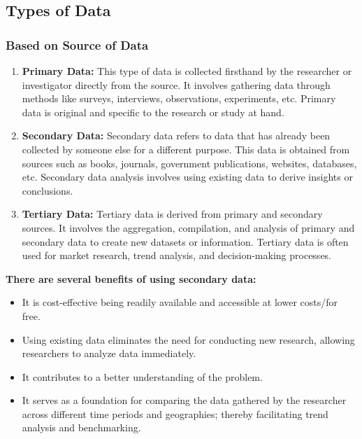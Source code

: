\documentclass{article}
\begin{document}
        \subsection{Types of Data}
            \subsubsection{Based on Source of Data}
            \begin{enumerate}
                \item \textbf{Primary Data:} This type of data is collected firsthand by the researcher or investigator directly from the source. It involves gathering data through methods like surveys, interviews, observations, experiments, etc. Primary data is original and specific to the research or study at hand.
        
                \item \textbf{Secondary Data:} Secondary data refers to data that has already been collected by someone else for a different purpose. This data is obtained from sources such as books, journals, government publications, websites, databases, etc. Secondary data analysis involves using existing data to derive insights or conclusions.
        
                \item \textbf{Tertiary Data:} Tertiary data is derived from primary and secondary sources. It involves the aggregation, compilation, and analysis of primary and secondary data to create new datasets or information. Tertiary data is often used for market research, trend analysis, and decision-making processes.
            \end{enumerate}
            \bigskip

            \noindent \textbf{There are several benefits of using secondary data:}
            \begin{itemize}
                \item It is cost-effective being readily available and accessible at lower costs/for free.
                \item Using existing data eliminates the need for conducting new research, allowing researchers to analyze data immediately.
                \item It contributes to a better understanding of the problem.
                \item It serves as a foundation for comparing the data gathered by the researcher across different time periods and geographies; thereby facilitating trend analysis and benchmarking.
            \end{itemize}
            
\end{document}
